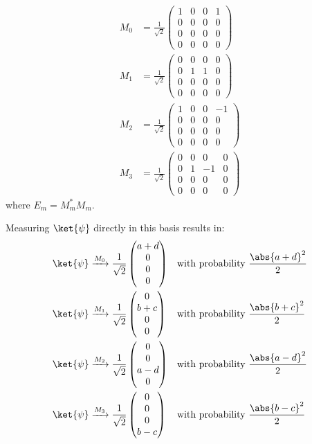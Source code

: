 \begin{align*}
M_0 &= \frac{1}{\sqrt{2}} \begin{pmatrix} 1 & 0 & 0 & 1 \\ 0 & 0 & 0 & 0 \\ 0 & 0 & 0 & 0 \\ 0 & 0 & 0 & 0 \end{pmatrix} \\
M_1 &= \frac{1}{\sqrt{2}} \begin{pmatrix} 0 & 0 & 0 & 0 \\ 0 & 1 & 1 & 0 \\ 0 & 0 & 0 & 0 \\ 0 & 0 & 0 & 0 \end{pmatrix} \\
M_2 &= \frac{1}{\sqrt{2}} \begin{pmatrix} 1 & 0 & 0 & -1 \\ 0 & 0 & 0 & 0 \\ 0 & 0 & 0 & 0 \\ 0 & 0 & 0 & 0 \end{pmatrix} \\
M_3 &= \frac{1}{\sqrt{2}} \begin{pmatrix} 0 & 0 & 0 & 0 \\ 0 & 1 & -1 & 0 \\ 0 & 0 & 0 & 0 \\ 0 & 0 & 0 & 0 \end{pmatrix}
\end{align*}
%
where $E_m = M_m ^* M_m$.
%
\par Measuring $\ket{\psi}$ directly in this basis results in:
%
\begin{align*}
\ket{\psi} & \xrightarrow{M_0} \frac{1}{\sqrt{2}} \begin{pmatrix} a + d \\ 0 \\ 0 \\ 0 \end{pmatrix} && \text{with probability $\frac{\abs{a+d}^2}{2}$} \\
\ket{\psi} & \xrightarrow{M_1} \frac{1}{\sqrt{2}} \begin{pmatrix} 0 \\ b + c \\ 0 \\ 0 \end{pmatrix} && \text{with probability $\frac{\abs{b+c}^2}{2}$} \\
\ket{\psi} & \xrightarrow{M_2} \frac{1}{\sqrt{2}} \begin{pmatrix} 0 \\ 0 \\ a - d \\ 0 \end{pmatrix} && \text{with probability $\frac{\abs{a-d}^2}{2}$} \\
\ket{\psi} & \xrightarrow{M_3} \frac{1}{\sqrt{2}} \begin{pmatrix} 0 \\ 0 \\ 0 \\b - c \end{pmatrix} && \text{with probability $\frac{\abs{b-c}^2}{2}$}
\end{align*}
\endgroup
